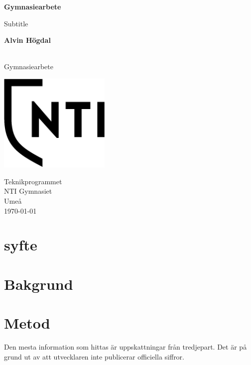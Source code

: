\documentclass[11p]{article}
\def\name{Alvin Högdal}
\begin{document}
    \begin{titlepage}
        \begin{center}
            \vspace*{1cm}

            \Huge
            \textbf{Gymnasiearbete}

            \vspace{0.5cm}
            \LARGE
            Subtitle

            \vspace{1.5cm}

            \textbf{\name}

            \vfill

             \\
            Gymnasiearbete

            \vspace{0.8cm}

            \includegraphics[width=0.4\textwidth]{../images/NTI Gymnasiet_Symbol_print_svart}

            \Large
            Teknikprogrammet\\
            NTI Gymnasiet\\
            Umeå\\
            \today

        \end{center}
    \end{titlepage}
    \tableofcontents
    \newpage

\setlength{\parindent}{0pt}
\setlength{\parskip}{10pt}



\section{syfte}



\section{Bakgrund}
\section{Metod}


Den mesta information som hittas är uppskattningar från tredjepart.
Det är på grund ut av att utvecklaren inte publicerar officiella siffror.

\printbibliography
\end{document}
